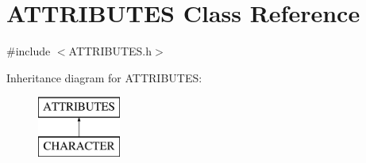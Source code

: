 \hypertarget{class_a_t_t_r_i_b_u_t_e_s}{}\section{A\+T\+T\+R\+I\+B\+U\+T\+ES Class Reference}
\label{class_a_t_t_r_i_b_u_t_e_s}


{\ttfamily \#include $<$A\+T\+T\+R\+I\+B\+U\+T\+E\+S.\+h$>$}

Inheritance diagram for A\+T\+T\+R\+I\+B\+U\+T\+ES\+:\begin{figure}[H]
\begin{center}
\leavevmode
\includegraphics[height=2.000000cm]{class_a_t_t_r_i_b_u_t_e_s}
\end{center}
\end{figure}
